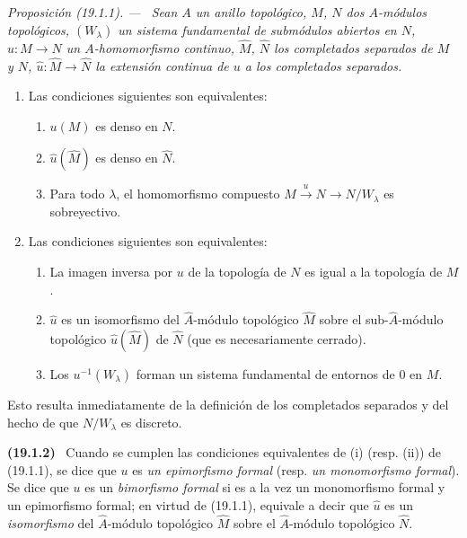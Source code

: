 \documentclass[10pt,oneside]{book}
\makeatletter
\newcommand{\setmanualcurrentlabel}[1]{\def\@currentlabel{#1}}
\newenvironment{env}[1][]{\setmanualcurrentlabel{#1}\par\medskip\noindent\textbf{(#1)}\ }{\par}
\newenvironment{proposition}[1][]{%
  \setmanualcurrentlabel{#1}\par\medskip\noindent\itshape Proposición (#1). ---\ }{\par}
\makeatother
\begin{document}
\begin{proposition}[19.1.1]
\label{0.19.1.1-es}
Sean $A$ un anillo topológico, $M$, $N$ dos $A$-módulos topológicos,
$(W_\lambda)$ un sistema fundamental de submódulos abiertos en $N$,
$u:M\to N$ un $A$-homomorfismo continuo, $\widehat M$, $\widehat N$ los
completados separados de $M$ y $N$, $\widehat u:\widehat M\to\widehat N$ la
extensión continua de $u$ a los completados separados.
\begin{enumerate}
  \item[\textup{(i)}] Las condiciones siguientes son equivalentes:
  \begin{enumerate}
    \item[\textup{a)}] $u(M)$ es denso en $N$.
    \item[\textup{a$'$)}] $\widehat u(\widehat M)$ es denso en $\widehat N$.
    \item[\textup{a$''$)}] Para todo $\lambda$, el homomorfismo compuesto
    $M\xrightarrow{u}N\to N/W_\lambda$ es sobreyectivo.
  \end{enumerate}
  \item[\textup{(ii)}] Las condiciones siguientes son equivalentes:
  \begin{enumerate}
    \item[\textup{b)}] La imagen inversa por $u$ de la topología de $N$ es igual a la
    topología de $M$.
    \item[\textup{b$'$)}] $\widehat u$ es un isomorfismo del $\widehat A$-módulo
    topológico $\widehat M$ sobre el sub-$\widehat A$-módulo topológico
    $\widehat u(\widehat M)$ de $\widehat N$ (que es necesariamente
    cerrado).
    \item[\textup{b$''$)}] Los $u^{-1}(W_\lambda)$ forman un sistema fundamental de
    entornos de 0 en $M$.
  \end{enumerate}
\end{enumerate}
\end{proposition}

Esto resulta inmediatamente de la definición de los completados separados y del hecho
de que $N/W_\lambda$ es discreto.

\begin{env}[19.1.2]
\label{0.19.1.2-es}
Cuando se cumplen las condiciones equivalentes de (i) (resp. (ii)) de (19.1.1),
se dice que $u$ es \emph{un epimorfismo formal} (resp. \emph{un
monomorfismo formal}). Se dice que $u$ es un \emph{bimorfismo formal}
si es a la vez un monomorfismo formal y un epimorfismo formal; en
virtud de (19.1.1), equivale a decir que $\widehat u$ es un
\emph{isomorfismo} del $\widehat A$-módulo topológico $\widehat M$ sobre el
$\widehat A$-módulo topológico $\widehat N$.
\end{env}
\end{document}
